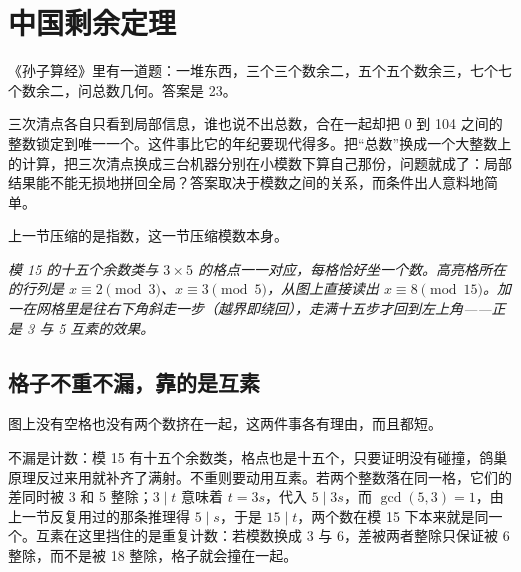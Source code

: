 \section{中国剩余定理}
\label{sec:04-Discrete-Mathematics/04-Number-Theory/04}

《孙子算经》里有一道题：一堆东西，三个三个数余二，五个五个数余三，七个七个数余二，问总数几何。答案是 23。

三次清点各自只看到局部信息，谁也说不出总数，合在一起却把 0 到 104 之间的整数锁定到唯一一个。这件事比它的年纪要现代得多。把``总数''换成一个大整数上的计算，把三次清点换成三台机器分别在小模数下算自己那份，问题就成了：局部结果能不能无损地拼回全局？答案取决于模数之间的关系，而条件出人意料地简单。

上一节压缩的是指数，这一节压缩模数本身。

\begin{center}

\emph{模 15 的十五个余数类与 \(3\times5\) 的格点一一对应，每格恰好坐一个数。高亮格所在的行列是 \(x\equiv2\pmod3\)、\(x\equiv3\pmod5\)，从图上直接读出 \(x\equiv8\pmod{15}\)。加一在网格里是往右下角斜走一步（越界即绕回），走满十五步才回到左上角——正是 3 与 5 互素的效果。}
\end{center}

\subsection{格子不重不漏，靠的是互素}

图上没有空格也没有两个数挤在一起，这两件事各有理由，而且都短。

不漏是计数：模 15 有十五个余数类，格点也是十五个，只要证明没有碰撞，鸽巢原理反过来用就补齐了满射。不重则要动用互素。若两个整数落在同一格，它们的差同时被 3 和 5 整除；\(3\mid t\) 意味着 \(t=3s\)，代入 \(5\mid 3s\)，而 \(\gcd(5,3)=1\)，由上一节反复用过的那条推理得 \(5\mid s\)，于是 \(15\mid t\)，两个数在模 15 下本来就是同一个。互素在这里挡住的是重复计数：若模数换成 3 与 6，差被两者整除只保证被 6 整除，而不是被 18 整除，格子就会撞在一起。

